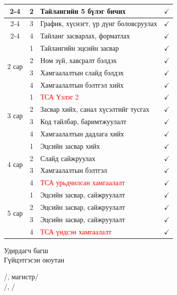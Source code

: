 \begin{table}[h!t]
\begin{tabular}{|c|c|p{7.5cm}|c|}
\cline{2-4}
& 2 & Тайлангийн 5 бүлэг бичих & $\checkmark$ \\
\cline{2-4}
& 3 & График, хүснэгт, үр дүнг боловсруулах & $\checkmark$ \\
\cline{2-4}
& 4 & Тайланг засварлах, форматлах & $\checkmark$ \\
\hline
\multirow{4}{*}{2 сар} & 1 & Тайлангийн эцсийн засвар & $\checkmark$ \\
\cline{2-4}
& 2 & Ном зүй, хавсралт бэлдэх & $\checkmark$ \\
\cline{2-4}
& 3 & Хамгаалалтын слайд бэлдэх & $\checkmark$ \\
\cline{2-4}
& 4 & Хамгаалалтын бэлтгэл хийх & $\checkmark$ \\
\hline
\multirow{4}{*}{3 сар} & 1 & \textcolor{red}{ТСА Үзлэг 2} & $\checkmark$ \\
\cline{2-4}
& 2 & Засвар хийх, санал хүсэлтийг тусгах & $\checkmark$ \\
\cline{2-4}
& 3 & Код тайлбар, баримтжуулалт & $\checkmark$ \\
\cline{2-4}
& 4 & Хамгаалалтын дадлага хийх & $\checkmark$ \\
\hline
\multirow{4}{*}{4 сар} & 1 & Эцсийн засвар хийх & $\checkmark$ \\
\cline{2-4}
& 2 & Слайд сайжруулах & $\checkmark$ \\
\cline{2-4}
& 3 & Хамгаалалтын бэлтгэл & $\checkmark$ \\
\cline{2-4}
& 4 & \textcolor{red}{ТСА урьдчилсан хамгаалалт} & $\checkmark$ \\
\hline
\multirow{4}{*}{5 сар} & 1 & Эцсийн засвар, сайжруулалт & $\checkmark$ \\
\cline{2-4}
& 2 & Эцсийн засвар, сайжруулалт & $\checkmark$ \\
\cline{2-4}
& 3 & Эцсийн засвар, сайжруулалт & $\checkmark$ \\
\cline{2-4}
& 4 & \textcolor{red}{ТСА үндсэн хамгаалалт} & $\checkmark$ \\
\hline
\end{tabular}
\end{table}

\vspace{10mm}
\noindent\begin{minipage}{0.4\textwidth}
Удирдагч багш\\
Гүйцэтгэсэн оюутан
\end{minipage}
\hfill
\begin{minipage}{0.55\textwidth}
\raggedleft

/\supervisorname, магистр/\\
/\studentID, \authorShort/\\
\end{minipage}
\noindent
